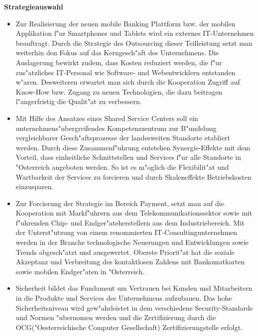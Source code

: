 \textbf{Strategieauswahl}\\

\begin{itemize}

	\item Zur Realisierung der neuen mobile Banking Plattform bzw. der mobilen Applikation f"ur Smartphones und Tablets wird ein externes IT-Unternehmen beauftragt. Durch die Strategie des Outsourcing dieser Teilleistung setzt man weiterhin den Fokus auf das Kerngesch"aft des Unternehmens. Die Auslagerung bewirkt zudem, dass Kosten reduziert werden, die f"ur zus"atzliches IT-Personal wie Software- und Webentwicklern entstanden w"aren. Desweiteren erwartet man sich durch die Kooperation Zugriff auf Know-How bzw. Zugang zu neuen Technologien, die dazu beitragen l"angerfristig die Qualit"at zu verbessern. \\

	\item Mit Hilfe des Ansatzes eines Shared Service Centers soll ein unternehmens"ubergreifendes Kompetenzzentrum zur B"undelung vergleichbarer Gesch"aftsprozesse der landesweiten Standorte etabliert werden. Durch diese Zusammenf"uhrung entstehen Synergie-Effekte mit dem Vorteil, dass einheitliche Schnittstellen und Services f"ur alle Standorte in "Osterreich angeboten werden. So ist es m"oglich die Flexibilit"at und Wartbarkeit der Services zu forcieren und durch Skaleneffekte Betriebskosten einzusparen.\\

	\item Zur Forcierung der Strategie im Bereich Payment, setzt man auf die Kooperation mit Markf"uhrern aus dem Telekommunikationssektor sowie mit f"uhrenden Chip- und Endger"ateherstellern aus dem Industriebereich. Mit der Unterst"utzung von einem renommierten IT-Consultingunternehmen werden in der Branche technologische Neuerungen und Entwicklungen sowie Trends abgesch"atzt und ausgewertet. Oberste Priorit"at hat die soziale Akzeptanz und Verbreitung des kontaktlosen Zahlens mit Bankomatkarten sowie mobilen Endger"aten in "Osterreich.\\


	\item Sicherheit bildet das Fundament um Vertrauen bei Kunden und Mitarbeitern in die Produkte und Services des Unternehmens aufzubauen. Das hohe Sicherheitsniveau wird gew"ahrleistet in dem verschiedene Security-Standards und Normen "ubernomen werden und die Zertifizierung durch die OCG("Oesterreichische Computer Gesellschaft) Zertifizierungstelle erfolgt.
	
\end{itemize}